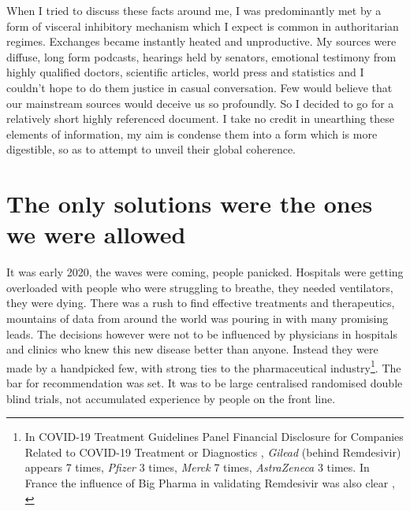 \documentclass[11pt,a4paper,notitlepage]{report}
\begin{document}
When I tried to discuss these facts around me, I was predominantly met by a form of visceral inhibitory mechanism which I expect is common in authoritarian regimes. Exchanges became instantly heated and unproductive. My sources were diffuse, long form podcasts, hearings held by senators, emotional testimony from highly qualified doctors, scientific articles, world press and statistics and I couldn't hope to do them justice in casual conversation. Few would believe that our mainstream sources would deceive us so profoundly. So I decided to go for a relatively short highly referenced document. I take no credit in unearthing these elements of information, my aim is condense them into a form which is more digestible, so as to attempt to unveil their global coherence.

\section*{The only solutions were the ones we were allowed}

It was early 2020, the waves were coming, people panicked. Hospitals were getting overloaded with people who were struggling to breathe, they needed ventilators, they were dying. There was a rush to find effective treatments and therapeutics, mountains of data from around the world was pouring in with many promising leads. The decisions however were not to be influenced by physicians in hospitals and clinics who knew this new disease better than anyone. Instead they were made by a handpicked few, with strong ties to the pharmaceutical industry\footnote{In COVID-19 Treatment Guidelines Panel Financial Disclosure for Companies Related to COVID-19 Treatment or Diagnostics \cite{nihTreatmentPanelFinancialDisclosure}, \textit{Gilead} (behind Remdesivir) appears 7 times, \textit{Pfizer} 3 times, \textit{Merck} 7 times, \textit{AstraZeneca} 3 times. In France the influence of Big Pharma in validating Remdesivir was also clear \cite{doi:10.1177/1440783320936740}, \cite{mediapart31032020}}. The bar for recommendation was set. It was to be large centralised randomised double blind trials, not accumulated experience by people on the front line.

\end{document}
